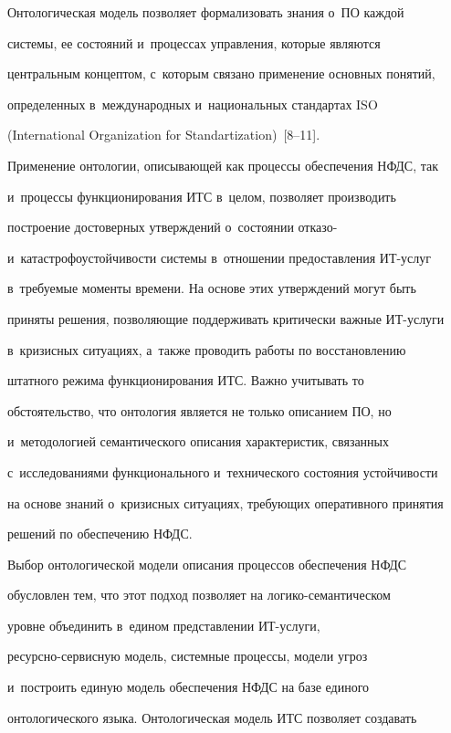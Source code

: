   Онтологическая модель позволяет формализовать знания о~ПО каждой


сис\-те\-мы, ее состояний и~процессах управления, которые являются


центральным концептом, с~которым связано применение основных понятий,


определенных в~международных и~национальных стандартах ISO


(International Organization for Standartization)~[8--11].


Применение онтологии, описывающей как процессы обеспечения НФДС, так


и~процессы функционирования ИТС в~целом, поз\-во\-ля\-ет производить


построение достоверных утверждений о~состоянии отказо-


и~катастрофоустойчивости сис\-те\-мы в~отношении предоставления ИТ-услуг


в~требуемые моменты времени. На основе этих утверждений могут быть


приняты решения, позволяющие поддерживать критически важные ИТ-услуги


в~кризисных ситуациях, а~так\-же проводить работы по восстановлению


штатного режима функционирования ИТС. Важно учитывать то


обстоятельство, что онтология является не только описанием ПО, но


и~методологией семантического описания характеристик, связанных


с~исследованиями функционального и~технического состояния устойчивости


на основе знаний о~кризисных ситуациях, требующих оперативного принятия


решений по обеспечению НФДС.





  Выбор онтологической модели описания процессов обеспечения НФДС


обуслов\-лен тем, что этот подход позволяет на ло\-ги\-ко-се\-ман\-ти\-че\-ском


уровне объединить в~едином представлении ИТ-услу\-ги,


  ре\-сурс\-но-сер\-вис\-ную модель, системные процессы, модели угроз


и~построить единую модель обеспечения НФДС на базе единого


онтологического языка. Онтологическая модель ИТС позволяет создавать


